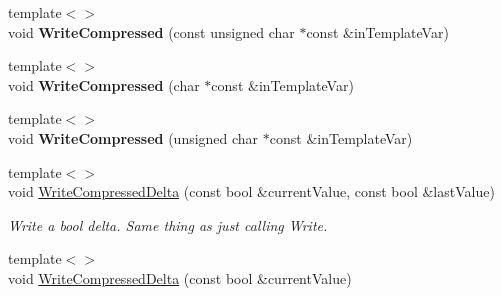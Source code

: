 \begin{DoxyCompactItemize}
\item 
\hypertarget{class_rak_net_1_1_bit_stream_aeb96f3b7b0b233dac283972a66d80bad}{{\footnotesize template$<$$>$ }\\void {\bfseries Write\-Compressed} (const unsigned char $\ast$const \&in\-Template\-Var)}\label{class_rak_net_1_1_bit_stream_aeb96f3b7b0b233dac283972a66d80bad}

\item 
\hypertarget{class_rak_net_1_1_bit_stream_aabc9980a399192c2e5c04d951549528b}{{\footnotesize template$<$$>$ }\\void {\bfseries Write\-Compressed} (char $\ast$const \&in\-Template\-Var)}\label{class_rak_net_1_1_bit_stream_aabc9980a399192c2e5c04d951549528b}

\item 
\hypertarget{class_rak_net_1_1_bit_stream_a26e001ffea5757a771d04d94d0c56a9d}{{\footnotesize template$<$$>$ }\\void {\bfseries Write\-Compressed} (unsigned char $\ast$const \&in\-Template\-Var)}\label{class_rak_net_1_1_bit_stream_a26e001ffea5757a771d04d94d0c56a9d}

\item 
{\footnotesize template$<$$>$ }\\void \hyperlink{class_rak_net_1_1_bit_stream_a8f5f7b8b48221334644d4f50ee6d5762}{Write\-Compressed\-Delta} (const bool \&current\-Value, const bool \&last\-Value)
\begin{DoxyCompactList}\small\item\em Write a bool delta. Same thing as just calling Write. \end{DoxyCompactList}\item 
\hypertarget{class_rak_net_1_1_bit_stream_a8cf066d10aafd4e935dd1bbced77a1a7}{{\footnotesize template$<$$>$ }\\void \hyperlink{class_rak_net_1_1_bit_stream_a8cf066d10aafd4e935dd1bbced77a1a7}{Write\-Compressed\-Delta} (const bool \&current\-Value)}\label{class_rak_net_1_1_bit_stream_a8cf066d10aafd4e935dd1bbced77a1a7}


\end{DoxyCompactItemize}
